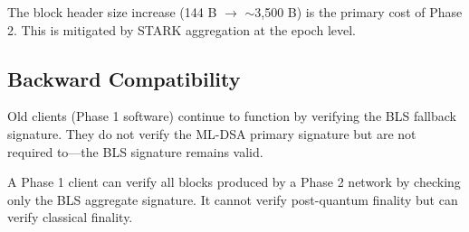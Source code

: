 The block header size increase (144 B $\to$ $\sim$3,500 B) is the primary cost of Phase 2. This is mitigated by STARK aggregation at the epoch level.

\subsection{Backward Compatibility}

Old clients (Phase 1 software) continue to function by verifying the BLS fallback signature. They do not verify the ML-DSA primary signature but are not required to---the BLS signature remains valid.

\begin{property}
A Phase 1 client can verify all blocks produced by a Phase 2 network by checking only the BLS aggregate signature. It cannot verify post-quantum finality but can verify classical finality.
\end{property}

